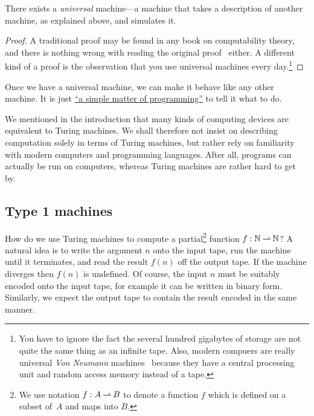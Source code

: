 \begin{theorem}[Turing]
  \label{thm:universal-machine}
  There exists a \emph{universal} machine---a machine that takes a
  description of another machine, as explained above, and simulates
  it.
\end{theorem}

\begin{proof}
  A traditional proof may be found in any book on computability
  theory, and there is nothing wrong with reading the original
  proof~\cite{Turing} either. A different kind of a proof is the
  observation that you use universal machines every day.\footnote{You
    have to ignore the fact the several hundred gigabytes of storage
    are not quite the same thing as an infinite tape. Also, modern
    compuers are really universal \emph{Von Neumann}
    machines~\cite{vonNeumann} because they have a central processing
    unit and random access memory instead of a tape.}
\end{proof}

Once we have a universal machine, we can make it behave like any other
machine. It is just
\href{http://www.catb.org/jargon/html/S/SMOP.html}{``a simple matter
  of programming''} to tell it what to do.

We mentioned in the introduction that many kinds of computing devices
are equivalent to Turing machines. We shall therefore not insist on
describing computation solely in terms of Turing machines, but rather
rely on familiarity with modern computers and programming languages.
After all, programs can actually be run on computers, whereas Turing
machines are rather hard to get by.


\subsection{Type 1 machines}
\label{sec:type-1}

How do we use Turing machines to compute a partial\footnote{We use
  notation $f : A \mathbin{\rightharpoonup} B$ to denote a function $f$ which is defined
  on a subset of~$A$ and maps into $B$.} function $f : \mathbb{N} \mathbin{\rightharpoonup}
\mathbb{N}$? A natural idea is to write the argument $n$ onto the input tape,
run the machine until it terminates, and read the result $f(n)$ off
the output tape. If the machine diverges then $f(n)$ is undefined. Of
course, the input $n$ must be suitably encoded onto the input tape,
for example it can be written in binary form. Similarly, we expect the
output tape to contain the result encoded in the same manner.

